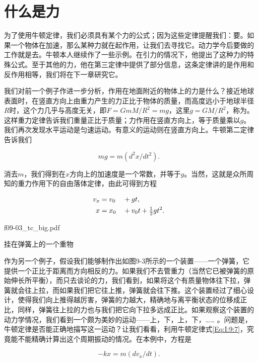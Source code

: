 \documentclass[12pt,oneside]{book}
\begin{document}
\section{什么是力}
为了使用牛顿定律，我们必须具有某个力的公式；因为这些定律提醒我们：要。如果一个物体在加速，那么某种力就在起作用，让我们去寻找它。动力学今后要做的工作就是去。牛顿本人继续作了一些示例。在引力的情况下，他提出了这种力的特殊公式。至于其他的力，他在第三定律中提供了部分信息，这条定律讲的是作用和反作用相等，我们将在下一章研究它。

我们对前一个例子作进一步分析，作用在地面附近的物体上的力是什么？接近地球表面时，在竖直方向上由重力产生的力正比于物体的质量，而高度远小于地球半径$ R $时，这个力几乎与高度无关，即$ F=GmM/R^2= mg$，这里$ g=GM/R^2 $，称为。这样重力定律告诉我们重量正比于质量；力作用在竖直方向上，等于质量乘以$ g $。我们再次发现水平运动是匀速运动。有意义的运动则在竖直方向上。牛顿第二定律告诉我们

\begin{equation}
\label{Eq:I:9:9}
mg=m(d^2x/dt^2).
\end{equation}

消去$ m $，我们得到在$ x $方向上的加速度是一个常数，并等于$ g $。当然，这就是众所周知的重力作用下的自由落体定律，由此可得到方程

\begin{alignat}{2}
v_x&=v_0&&+gt,\notag\\
\label{Eq:I:9:10}
x&=x_0&&+v_0t+\tfrac{1}{2}gt^2.
\end{alignat}

\begin{fig}{f09-03_tc_big.pdf}
\caption{挂在弹簧上的一个重物}
\label{fig:挂在弹簧上的一个重物}
\end{fig}

作为另一个例子，假设我们能够制作出如图9-3所示的一个装置——一个弹簧，它提供一个正比于距离而方向相反的力。如果我们不去管重力（当然它已被弹簧的原始伸长所平衡），而只去谈论的力，我们看到，如果将这个有质量物体往下拉，弹簧就会往上拉，而如果我们把它往上推，弹簧就会往下推。这个装置经过了细心设计，使得我们向上推得越厉害，弹簧的力越大，精确地与离平衡状态的位移成正比，同样，弹簧往上拉的力也与我们把它向下拉多远成正比。如果观察这个装置的动力学情况，我们看到一个颇为美妙的运动——上，下，上，下，…… 。问题是，牛顿定律是否能正确地描写这一运动？让我们看看，利用牛顿定律式\eqref{Eq:I:9:7}，究竟能不能精确计算出这个周期振动的情况。在本例中，方程是

\begin{equation}
\label{Eq:I:9:11}
-kx=m(dv_x/dt).
\end{equation}
\end{document}
